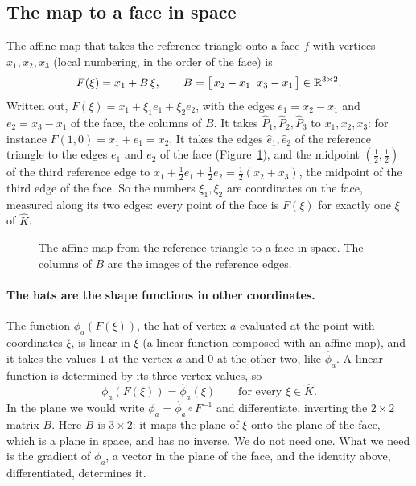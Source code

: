 \subsection{The map to a face in space}

The affine map that takes the reference triangle onto a face $f$ with vertices $x_1, x_2, x_3$ (local numbering, in the order of the face) is
\begin{equation}
\label{eqn:affine}
F(\xi) = x_1 + B\, \xi, \qquad B = \big[\, x_2 - x_1 \;\; x_3 - x_1 \,\big] \in \mathbb{R}^{3 \times 2}.
\end{equation}
Written out, $F(\xi) = x_1 + \xi_1 e_1 + \xi_2 e_2$, with the edges $e_1 = x_2 - x_1$ and $e_2 = x_3 - x_1$ of the face, the columns of $B$. It takes $\hat P_1, \hat P_2, \hat P_3$ to $x_1, x_2, x_3$: for instance $F(1, 0) = x_1 + e_1 = x_2$. It takes the edges $\hat e_1, \hat e_2$ of the reference triangle to the edges $e_1$ and $e_2$ of the face (Figure~\ref{fig:reference}), and the midpoint $(\frac12, \frac12)$ of the third reference edge to $x_1 + \frac12 e_1 + \frac12 e_2 = \frac12(x_2 + x_3)$, the midpoint of the third edge of the face. So the numbers $\xi_1, \xi_2$ are coordinates on the face, measured along its two edges: every point of the face is $F(\xi)$ for exactly one $\xi$ of $\hat K$.

\begin{figure}[t]
\centering
\begin{minipage}[c]{0.5\textwidth}\centering{}\end{minipage}\hfill
\begin{minipage}[c]{0.45\textwidth}\centering{}\end{minipage}
\caption{The affine map from the reference triangle to a face in space. The columns of $B$ are the images of the reference edges.}
\label{fig:reference}
\end{figure}

\paragraph{The hats are the shape functions in other coordinates.} The function $\phi_a(F(\xi))$, the hat of vertex $a$ evaluated at the point with coordinates $\xi$, is linear in $\xi$ (a linear function composed with an affine map), and it takes the values $1$ at the vertex $a$ and $0$ at the other two, like $\hat\phi_a$. A linear function is determined by its three vertex values, so
\begin{equation*}
\phi_a(F(\xi)) = \hat\phi_a(\xi) \qquad \text{for every } \xi \in \hat K .
\end{equation*}
In the plane we would write $\phi_a = \hat\phi_a \circ F^{-1}$ and differentiate, inverting the $2\times 2$ matrix $B$. Here $B$ is $3 \times 2$: it maps the plane of $\xi$ onto the plane of the face, which is a plane in space, and has no inverse. We do not need one. What we need is the gradient of $\phi_a$, a vector in the plane of the face, and the identity above, differentiated, determines it.

